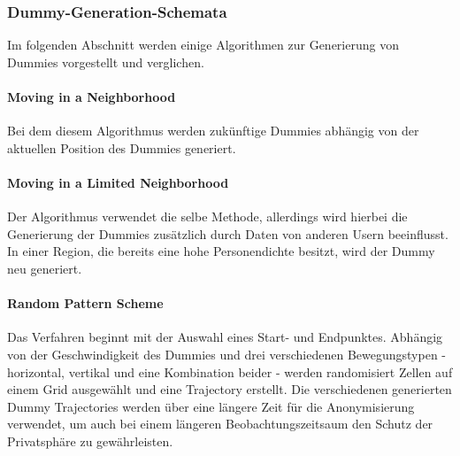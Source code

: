 \subsubsection{Dummy-Generation-Schemata \cite{You2007, Lei2012, Kido2005}} \label{subsubsection:dgschema}
Im folgenden Abschnitt werden einige Algorithmen zur Generierung von Dummies vorgestellt und verglichen.
	\paragraph{Moving in a Neighborhood \cite{Kido2005}} Bei dem diesem Algorithmus werden zukünftige Dummies abhängig von der aktuellen Position des Dummies generiert.
	\paragraph{Moving in a Limited Neighborhood} \cite{Kido2005} Der Algorithmus verwendet die selbe Methode, allerdings wird hierbei die Generierung der Dummies zusätzlich durch Daten von anderen Usern beeinflusst. In einer Region, die bereits eine hohe Personendichte besitzt, wird der Dummy neu generiert.
	\paragraph{Random Pattern Scheme \cite{You2007}} Das Verfahren beginnt mit der Auswahl eines Start- und Endpunktes. Abhängig von der Geschwindigkeit des Dummies und drei verschiedenen Bewegungstypen - horizontal, vertikal und eine Kombination beider - werden randomisiert Zellen auf einem Grid ausgewählt und eine Trajectory erstellt. Die verschiedenen generierten Dummy Trajectories werden über eine längere Zeit für die Anonymisierung verwendet, um auch bei einem längeren Beobachtungszeitsaum den Schutz der Privatsphäre zu gewährleisten.
